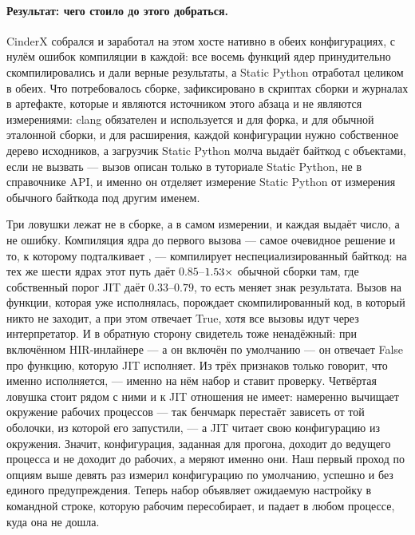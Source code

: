 \paragraph{Результат: чего стоило до этого добраться.}
CinderX собрался и заработал на этом хосте нативно в обеих конфигурациях, с нулём ошибок
компиляции в каждой: все восемь функций ядер принудительно скомпилировались и дали верные
результаты, а Static Python отработал целиком в обеих. Что потребовалось сборке, зафиксировано в
скриптах сборки и журналах в артефакте, которые и являются источником этого абзаца и не являются
измерениями: clang обязателен и используется и для форка, и для обычной эталонной сборки, и для
расширения, каждой конфигурации нужно собственное дерево исходников, а загрузчик Static Python
молча выдаёт байткод с объектами, если не вызвать
 --- вызов описан только в туториале Static
Python, не в справочнике API, и именно он отделяет
измерение Static Python от измерения обычного байткода под другим именем.

Три ловушки лежат не в сборке, а в самом измерении, и каждая выдаёт число, а не ошибку. Компиляция
ядра до первого вызова --- самое очевидное решение и то, к которому подталкивает ,
--- компилирует неспециализированный байткод: на тех же шести ядрах этот путь даёт
$0.85$--$\meas{ratio:b6_cinderx-jitopt_compile_at_first_call:matmul/jitopt_compile_at_first_call|b6_cinderx-stock:matmul/stock}{1.53}\times$ обычной сборки там, где собственный порог JIT даёт $0.33$--$0.79$, то есть
меняет знак результата. Вызов  на функции, которая уже исполнялась, порождает
скомпилированный код, в который никто не заходит, а  при этом отвечает
True, хотя все вызовы идут через интерпретатор. И в обратную сторону 
свидетель тоже ненадёжный: при включённом HIR-инлайнере --- а он включён по умолчанию --- он
отвечает False про функцию, которую JIT исполняет. Из трёх признаков только
 говорит, что именно исполняется, --- именно на нём набор и ставит проверку.
Четвёртая ловушка стоит рядом с ними и к JIT отношения не имеет:  намеренно вычищает
окружение рабочих процессов --- так бенчмарк перестаёт зависеть от той оболочки, из которой его
запустили, --- а JIT читает свою конфигурацию из окружения. Значит, конфигурация, заданная для
прогона, доходит до ведущего процесса и не доходит до рабочих, а меряют именно они. Наш первый
проход по опциям выше девять раз измерил конфигурацию по умолчанию, успешно и без единого
предупреждения. Теперь набор объявляет ожидаемую настройку в командной строке, которую
 рабочим пересобирает, и падает в любом процессе, куда она не дошла.

